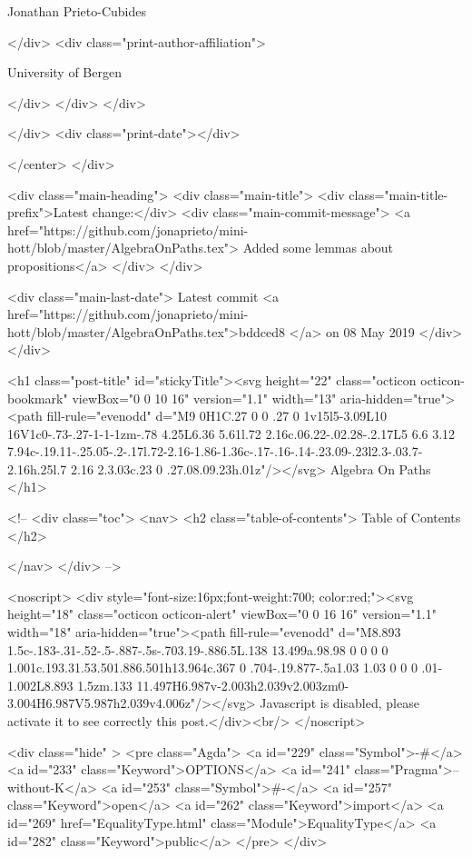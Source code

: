                   Jonathan Prieto-Cubides
                
              </div>
              <div class="print-author-affiliation">
                
                  University of Bergen
                
                </div>
            </div>
          </div>
          
          
        </div>
        <div class="print-date"></div>
        
        
    </center>
  </div>

  
  <div class="main-heading">
    <div class="main-title">
      <div class="main-title-prefix">Latest change:</div>
      <div class="main-commit-message">
            <a href="https://github.com/jonaprieto/mini-hott/blob/master/AlgebraOnPaths.tex">
              Added some lemmas about propositions</a>
      </div>
    </div>

    <div class="main-last-date">
      Latest commit <a href="https://github.com/jonaprieto/mini-hott/blob/master/AlgebraOnPaths.tex">bddced8 </a> on  08 May 2019
    </div>
  </div>
  
  <h1 class="post-title" id="stickyTitle"><svg height="22" class="octicon octicon-bookmark" viewBox="0 0 10 16" version="1.1" width="13" aria-hidden="true"><path fill-rule="evenodd" d="M9 0H1C.27 0 0 .27 0 1v15l5-3.09L10 16V1c0-.73-.27-1-1-1zm-.78 4.25L6.36 5.61l.72 2.16c.06.22-.02.28-.2.17L5 6.6 3.12 7.94c-.19.11-.25.05-.2-.17l.72-2.16-1.86-1.36c-.17-.16-.14-.23.09-.23l2.3-.03.7-2.16h.25l.7 2.16 2.3.03c.23 0 .27.08.09.23h.01z"/></svg> Algebra On Paths
  </h1>

  <!-- 
  <div class="toc">
    <nav>
    <h2 class="table-of-contents"> Table of Contents </h2>
      

    </nav>
  </div>
   -->

  <noscript>
  <div style="font-size:16px;font-weight:700; color:red;"><svg height="18" class="octicon octicon-alert" viewBox="0 0 16 16" version="1.1" width="18" aria-hidden="true"><path fill-rule="evenodd" d="M8.893 1.5c-.183-.31-.52-.5-.887-.5s-.703.19-.886.5L.138 13.499a.98.98 0 0 0 0 1.001c.193.31.53.501.886.501h13.964c.367 0 .704-.19.877-.5a1.03 1.03 0 0 0 .01-1.002L8.893 1.5zm.133 11.497H6.987v-2.003h2.039v2.003zm0-3.004H6.987V5.987h2.039v4.006z"/></svg> Javascript is disabled, please activate it to see correctly this post.</div><br/>
  </noscript>

  <div class="hide" >
<pre class="Agda">
<a id="229" class="Symbol">{-#</a> <a id="233" class="Keyword">OPTIONS</a> <a id="241" class="Pragma">--without-K</a> <a id="253" class="Symbol">#-}</a>
<a id="257" class="Keyword">open</a> <a id="262" class="Keyword">import</a> <a id="269" href="EqualityType.html" class="Module">EqualityType</a> <a id="282" class="Keyword">public</a>
</pre>
</div>

